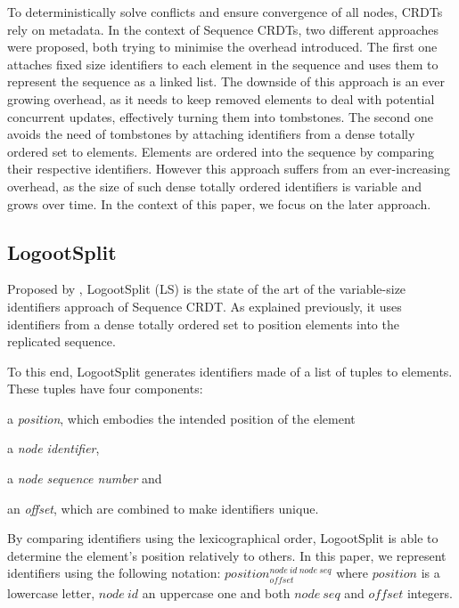 \documentclass[sigplan,10pt]{acmart}
\newcommand{\trm}[1]{\mathit{#1}}
\newcommand{\id}[3]{$\trm{#1}^{\trm{#2}}_{\trm{#3}}$}
\begin{document}
To deterministically solve conflicts and ensure convergence of all nodes, \acp{CRDT} rely on metadata.
In the context of Sequence \acp{CRDT}, two different approaches were proposed, both trying to minimise the overhead introduced.
The first one \cite{oster:inria-00108523, ROH2011354,briot:hal-01343941} attaches fixed size identifiers to each element in the sequence and uses them to represent the sequence as a linked list.
The downside of this approach is an ever growing overhead, as it needs to keep removed elements to deal with potential concurrent updates, effectively turning them into tombstones.
The second one \cite{5158449,WeissICDCS09,AndreCollaborateCom2013} avoids the need of tombstones by attaching identifiers from a dense totally ordered set to elements.
Elements are ordered into the sequence by comparing their respective identifiers.
However this approach suffers from an ever-increasing overhead, as the size of such dense totally ordered identifiers is variable and grows over time.
In the context of this paper, we focus on the later approach.

\subsection{LogootSplit}

Proposed by \citet{AndreCollaborateCom2013}, LogootSplit (LS) is the state of the art of the variable-size identifiers approach of Sequence \ac{CRDT}.
As explained previously, it uses identifiers from a dense totally ordered set to position elements into the replicated sequence.

To this end, LogootSplit generates identifiers made of a list of tuples to elements.
These tuples have four components:
\begin{enumerate*}
    \item a \emph{position}, which embodies the intended position of the element
    \item a \emph{node identifier},
    \item a \emph{node sequence number} and
    \item an \emph{offset}, which are combined to make identifiers unique.
\end{enumerate*}
By comparing identifiers using the lexicographical order, LogootSplit is able to determine the element's position relatively to others.
In this paper, we represent identifiers using the following notation: \id{position}{node~id~node~seq}{offset} where $\trm{position}$ is a lowercase letter, $\trm{node~id}$ an uppercase one and both $\trm{node~seq}$ and $\trm{offset}$ integers.
\end{document}
